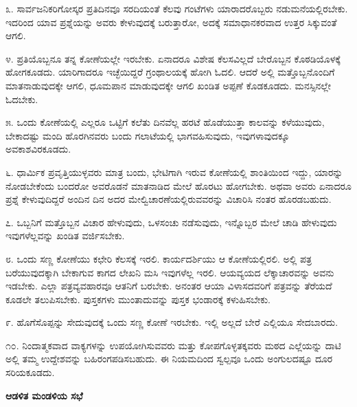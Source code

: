 ೩. ಸಾರ್ವಜನಿಕರಿಗೋಸ್ಕರ ಪ್ರತಿದಿನವೂ ಸರದಿಯಂತೆ ಕೆಲವು ಗಂಟೆಗಳು ಯಾರಾದರೊಬ್ಬರು ನಡುಮನೆಯಲ್ಲಿರಬೇಕು. ಇದರಿಂದ ಯಾವ ಪ್ರಶ್ನೆಯನ್ನು ಅವರು ಕೇಳುವುದಕ್ಕೆ ಬರುತ್ತಾರೋ, ಅದಕ್ಕೆ ಸಮಾಧಾನಕರವಾದ ಉತ್ತರ ಸಿಕ್ಕುವಂತೆ ಆಗಲಿ.

\vspace{0.1cm}

೪. ಪ್ರತಿಯೊಬ್ಬನೂ ತನ್ನ ಕೋಣೆಯಲ್ಲೇ ಇರಬೇಕು. ಏನಾದರೂ ವಿಶೇಷ ಕೆಲಸವಿಲ್ಲದೆ ಬೇರೊಬ್ಬನ ಕೊಠಡಿಯೊಳಕ್ಕೆ ಹೋಗಕೂಡದು. ಯಾರಿಗಾದರೂ ಇಚ್ಛೆಯಿದ್ದರೆ ಗ್ರಂಥಾಲಯಕ್ಕೆ ಹೋಗಿ ಓದಲಿ. ಆದರೆ ಅಲ್ಲಿ ಮತ್ತೊಬ್ಬನೊಂದಿಗೆ ಮಾತನಾಡುವುದಕ್ಕೇ ಆಗಲಿ, ಧೂಮಪಾನ ಮಾಡುವುದಕ್ಕೇ ಆಗಲಿ ಖಂಡಿತ ಅಪ್ಪಣೆ ಕೊಡಕೂಡದು. ಮನಸ್ಸಿನಲ್ಲೇ ಓದಬೇಕು.

\vspace{0.1cm}

೫. ಒಂದು ಕೋಣೆಯಲ್ಲಿ ಎಲ್ಲರೂ ಒಟ್ಟಿಗೆ ಕಲೆತು ದಿನವೆಲ್ಲ ಹರಟೆ ಹೊಡೆಯುತ್ತಾ ಕಾಲವನ್ನು ಕಳೆಯುವುದು, ಬೇಕಾದಷ್ಟು ಮಂದಿ ಹೊರಗಿನವರು ಬಂದು ಗಲಾಟೆಯಲ್ಲಿ ಭಾಗವಹಿಸುವುದು, ಇವುಗಳಾವುದಕ್ಕೂ ಅವಕಾಶವಿರಕೂಡದು.

\vspace{0.1cm}

೬. ಧಾರ್ಮಿಕ ಪ್ರವೃತ್ತಿಯುಳ್ಳವರು ಮಾತ್ರ ಬಂದು, ಭೇಟಿಗಾಗಿ ಇರುವ ಕೋಣೆಯಲ್ಲಿ ಶಾಂತಿಯಿಂದ ಇದ್ದು, ಯಾರನ್ನು ನೋಡಬೇಕೆಂದು ಬಂದರೋ ಅವರೊಡನೆ ಮಾತನಾಡಿದ ಮೇಲೆ ಹೊರಟು ಹೋಗಬೇಕು. ಅಥವಾ ಅವರು ಏನಾದರೂ ಪ್ರಶ್ನೆ ಕೇಳುವುದಿದ್ದರೆ ಅಂದಿನ ದಿನ ಅದರ ಮೇಲ್ವಿಚಾರಣೆಯಲ್ಲಿರುವವರನ್ನು ವಿಚಾರಿಸಿ ನಂತರ ಹೊರಡಬಹುದು.

\vspace{0.1cm}

೭. ಒಬ್ಬನಿಗೆ ಮತ್ತೊಬ್ಬನ ವಿಚಾರ ಹೇಳುವುದು, ಒಳಸಂಚು ನಡೆಸುವುದು, ಇನ್ನೊಬ್ಬರ ಮೇಲೆ ಚಾಡಿ ಹೇಳುವುದು ಇವುಗಳೆಲ್ಲವನ್ನು ಖಂಡಿತ ವರ್ಜಿಸಬೇಕು.

\vspace{0.1cm}

೮. ಒಂದು ಸಣ್ಣ ಕೋಣೆಯು ಕಛೇರಿ ಕೆಲಸಕ್ಕೆ ಇರಲಿ. ಕಾರ್ಯದರ್ಶಿಯು ಆ ಕೋಣೆಯಲ್ಲಿರಲಿ. ಅಲ್ಲಿ ಪತ್ರ ಬರೆಯುವುದಕ್ಕಾಗಿ ಬೇಕಾಗುವ ಕಾಗದ ಲೇಖನಿ ಮಸಿ ಇವುಗಳೆಲ್ಲ ಇರಲಿ. ಆಯವ್ಯಯದ ಲೆಕ್ಕಾಚಾರವನ್ನು ಅವನು ಇಡಬೇಕು. ಎಲ್ಲಾ ಪತ್ರವ್ಯವಹಾರವೂ ಆತನಿಗೆ ಬರಬೇಕು. ಅನಂತರ ಆಯಾ ವಿಳಾಸದವರಿಗೆ ಪತ್ರವನ್ನು ತೆರೆಯದೆ ಕೂಡಲೇ ತಲುಪಿಸಬೇಕು. ಪುಸ್ತಕಗಳು ಮುಂತಾದುವನ್ನು ಪುಸ್ತಕ ಭಂಡಾರಕ್ಕೆ ಕಳುಹಿಸಬೇಕು.

\eject

೯. ಹೊಗೆಸೊಪ್ಪನ್ನು ಸೇದುವುದಕ್ಕೆ ಒಂದು ಸಣ್ಣ ಕೋಣೆ ಇರಬೇಕು. ಇಲ್ಲಿ ಅಲ್ಲದೆ ಬೇರೆ ಎಲ್ಲಿಯೂ ಸೇದಬಾರದು.

\vspace{0.13cm}

೧೦. ನಿಂದಾತ್ಮಕವಾದ ವಾಕ್ಯಗಳನ್ನು ಉಪಯೋಗಿಸುವವರು ಮತ್ತು ಕೋಪಗೊಳ್ಳತಕ್ಕವರು ಮಠದ ಎಲ್ಲೆಯನ್ನು ದಾಟಿ ಅಲ್ಲಿ ತಮ್ಮ ಉದ್ದೇಶವನ್ನು ಬಹಿರಂಗಪಡಿಸಬಹುದು. ಈ ನಿಯಮದಿಂದ ಸ್ವಲ್ಪವೂ ಒಂದು ಅಂಗುಲದಷ್ಟೂ ದೂರ ಸರಿಯಕೂಡದು.

\begin{center}
\textbf{ಆಡಳಿತ ಮಂಡಳಿಯ ಸಭೆ}
\end{center}

